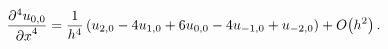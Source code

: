 \[\frac{{\partial}^{4}u_{0,0}}{{\partial x}^{4}}=\frac{1}{h^{4}}\,(u_{2,0}-4u_{1%
,0}+6u_{0,0}-4u_{-1,0}+u_{-2,0})+\mathop{O\/}\nolimits\!\left(h^{2}\right).\]